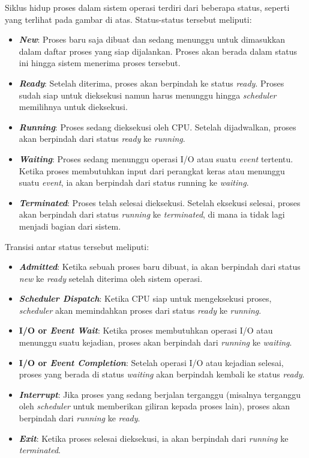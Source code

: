 \documentclass[12pt]{article}
\begin{document}
        Siklus hidup proses dalam sistem operasi terdiri dari beberapa status, seperti yang terlihat pada gambar di atas. Status-status tersebut meliputi:
        \begin{itemize}
            \item \textbf{\textit{New}}: Proses baru saja dibuat dan sedang menunggu  untuk dimasukkan dalam daftar proses yang siap dijalankan. Proses akan berada dalam status ini hingga sistem menerima proses tersebut.
            \item \textbf{\textit{Ready}}: Setelah diterima, proses akan berpindah ke status \textit{ready}. Proses sudah siap untuk dieksekusi namun harus menunggu hingga \textit{scheduler} memilihnya untuk dieksekusi.
            \item \textbf{\textit{Running}}: Proses sedang dieksekusi oleh CPU. Setelah dijadwalkan, proses akan berpindah dari status \textit{ready} ke \textit{running}.
            \item \textbf{\textit{Waiting}}: Proses sedang menunggu operasi I/O atau suatu \textit{event} tertentu. Ketika proses membutuhkan input dari perangkat keras atau menunggu suatu \textit{event}, ia akan berpindah dari status running ke \textit{waiting}.
            \item \textbf{\textit{Terminated}}: Proses telah selesai dieksekusi. Setelah eksekusi selesai, proses akan berpindah dari status \textit{running} ke \textit{terminated}, di mana ia tidak lagi menjadi bagian dari sistem.
        \end{itemize}
        Transisi antar status tersebut meliputi:
        \begin{itemize}
            \item \textbf{\textit{Admitted}}: Ketika sebuah proses baru dibuat, ia akan berpindah dari status \textit{new} ke \textit{ready} setelah diterima oleh sistem operasi.
            \item \textbf{\textit{Scheduler Dispatch}}: Ketika CPU siap untuk mengeksekusi proses, \textit{scheduler} akan memindahkan proses dari status \textit{ready} ke \textit{running}.
            \item \textbf{I/O or \textit{Event Wait}}: Ketika proses membutuhkan operasi I/O atau menunggu suatu kejadian, proses akan berpindah dari \textit{running} ke \textit{waiting}.
            \item \textbf{I/O or \textit{Event Completion}}: Setelah operasi I/O atau kejadian selesai, proses yang berada di status \textit{waiting} akan berpindah kembali ke status \textit{ready}.
            \item \textbf{\textit{Interrupt}}: Jika proses yang sedang berjalan terganggu (misalnya terganggu oleh \textit{scheduler} untuk memberikan giliran kepada proses lain), proses akan berpindah dari \textit{running} ke \textit{ready}.
            \item \textbf{\textit{Exit}}: Ketika proses selesai dieksekusi, ia akan berpindah dari \textit{running} ke \textit{terminated}.
        \end{itemize}
\end{document}
